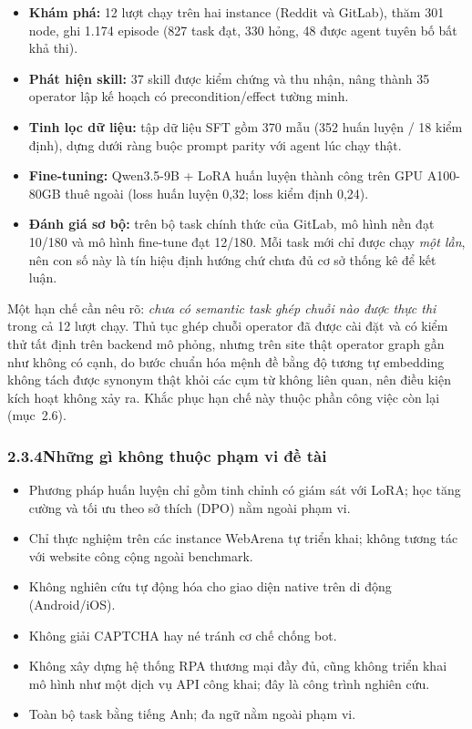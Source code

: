 \begin{itemize}
  \item \textbf{Khám phá:} 12 lượt chạy trên hai instance (Reddit và GitLab),
  thăm 301 node, ghi 1.174 episode (827 task đạt, 330 hỏng, 48 được agent
  tuyên bố bất khả thi).
  \item \textbf{Phát hiện skill:} 37 skill được kiểm chứng và thu nhận, nâng
  thành 35 operator lập kế hoạch có precondition/effect tường minh.
  \item \textbf{Tinh lọc dữ liệu:} tập dữ liệu SFT gồm 370 mẫu (352 huấn
  luyện / 18 kiểm định), dựng dưới ràng buộc prompt parity với agent lúc chạy
  thật.
  \item \textbf{Fine-tuning:} Qwen3.5-9B + LoRA huấn luyện thành công trên GPU
  A100-80GB thuê ngoài (loss huấn luyện 0,32; loss kiểm định 0,24).
  \item \textbf{Đánh giá sơ bộ:} trên bộ task chính thức của GitLab, mô hình
  nền đạt 10/180 và mô hình fine-tune đạt 12/180. Mỗi task mới chỉ được chạy
  \emph{một lần}, nên con số này là tín hiệu định hướng chứ chưa đủ cơ sở
  thống kê để kết luận.
\end{itemize}

Một hạn chế cần nêu rõ: \emph{chưa có semantic task ghép chuỗi nào được thực
thi} trong cả 12 lượt chạy. Thủ tục ghép chuỗi operator đã được cài đặt và có
kiểm thử tất định trên backend mô phỏng, nhưng trên site thật operator graph
gần như không có cạnh, do bước chuẩn hóa mệnh đề bằng độ tương tự embedding
không tách được synonym thật khỏi các cụm từ không liên quan, nên điều kiện
kích hoạt không xảy ra. Khắc phục hạn chế này thuộc phần công việc còn lại
(mục~2.6).

\subsubsection*{2.3.4\quad Những gì không thuộc phạm vi đề tài}

\begin{itemize}
  \item Phương pháp huấn luyện chỉ gồm tinh chỉnh có giám sát với LoRA; học
  tăng cường và tối ưu theo sở thích (DPO) nằm ngoài phạm vi.
  \item Chỉ thực nghiệm trên các instance WebArena tự triển khai; không tương
  tác với website công cộng ngoài benchmark.
  \item Không nghiên cứu tự động hóa cho giao diện native trên di động
  (Android/iOS).
  \item Không giải CAPTCHA hay né tránh cơ chế chống bot.
  \item Không xây dựng hệ thống RPA thương mại đầy đủ, cũng không triển khai
  mô hình như một dịch vụ API công khai; đây là công trình nghiên cứu.
  \item Toàn bộ task bằng tiếng Anh; đa ngữ nằm ngoài phạm vi.
\end{itemize}

